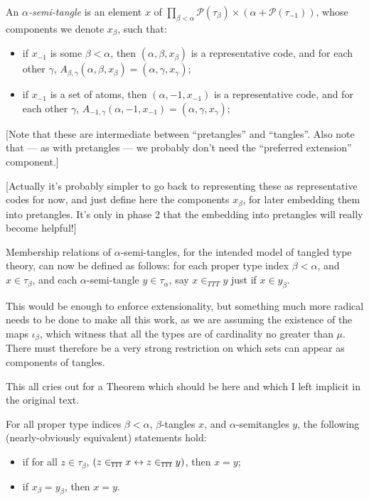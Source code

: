 \begin{definition}
  \label{def:semi-tangle}
  An \emph{$\alpha$-semi-tangle} is an element $x$ of $\prod_{\beta < \alpha}\mathcal{P}(\tau_\beta) \times (\alpha + \mathcal{P}(\tau_{-1}))$, whose components we denote $x_\beta$, such that:
  \begin{itemize}
    \item if $x_{-1}$ is some $\beta < \alpha$, then $(\alpha,\beta,x_\beta)$ is a representative code, and for each other $\gamma$, $A_{\beta,\gamma}(\alpha,\beta,x_\beta) = (\alpha,\gamma,x_\gamma)$;
    \item if $x_{-1}$ is a set of atoms, then $(\alpha,-1,x_{-1})$ is a representative code, and for each other $\gamma$, $A_{-1,\gamma}(\alpha,-1,x_{-1}) = (\alpha,\gamma,x_\gamma)$;
  \end{itemize}

  [Note that these are intermediate between “pretangles” and “tangles”.  Also note that — as with pretangles — we probably don’t need the “preferred extension” component.]

  [Actually it’s probably simpler to go back to representing these as representative codes for now, and just define here the components $x_\beta$, for later embedding them into pretangles.  It’s only in phase 2 that the embedding into pretangles will really become helpful!]
\end{definition}

\begin{definition}
\label{def:ttt-membership}
  Membership relations of $\alpha$-semi-tangles, for the intended model of tangled type theory, can now be defined as follows: for each proper type index $\beta < \alpha$, and $x \in \tau_\beta$, and each $\alpha$-semi-tangle $y \in \tau_\alpha$, say $x \in_{TTT} y$ just if $x \in y_\beta$.
\end{definition}

This would be enough to enforce extensionality, but something much more radical needs to be done to make all this work, as we are assuming the existence of the maps $\iota_\beta$, which witness that all the types are of cardinality no greater than $\mu$.  There must therefore be a very strong restriction on which sets can appear as components of tangles.

This all cries out for a Theorem which should be here and which I left implicit in the original text.

\begin{theorem}
\label {thm:extensionality}
For all proper type indices $\beta < \alpha$, $\beta$-tangles $x$, and $\alpha$-semitangles $y$, the following (nearly-obviously equivalent) statements hold:
\begin{itemize}
  \item if for all $z \in \tau_\beta$, $(z \in_{\tt TTT} x \leftrightarrow z \in_{\tt TTT} y)$, then $x=y$;
  \item if $x_\beta = y_\beta$, then $x=y$.
\end{itemize}
\end{theorem}

